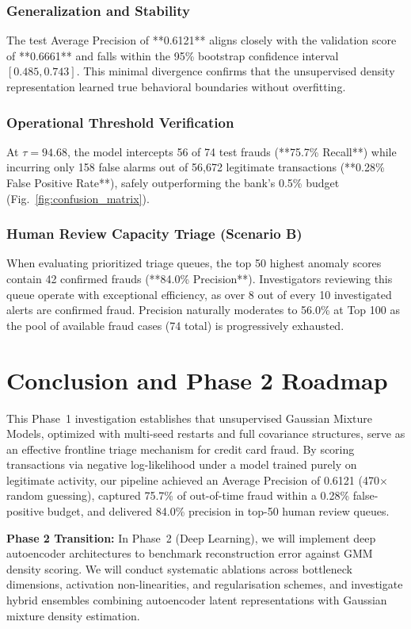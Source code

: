 \documentclass[10pt,journal,compsoc]{IEEEtran}
\begin{document}
\subsubsection{Generalization and Stability}
The test Average Precision of **0.6121** aligns closely with the validation score of **0.6661** and falls within the 95\% bootstrap confidence interval $[0.485, 0.743]$. This minimal divergence confirms that the unsupervised density representation learned true behavioral boundaries without overfitting.

\subsubsection{Operational Threshold Verification}
At $\tau = 94.68$, the model intercepts 56 of 74 test frauds (**75.7\% Recall**) while incurring only 158 false alarms out of 56,672 legitimate transactions (**0.28\% False Positive Rate**), safely outperforming the bank's 0.5\% budget (Fig.~\ref{fig:confusion_matrix}).

\subsubsection{Human Review Capacity Triage (Scenario B)}
When evaluating prioritized triage queues, the top 50 highest anomaly scores contain 42 confirmed frauds (**84.0\% Precision**). Investigators reviewing this queue operate with exceptional efficiency, as over 8 out of every 10 investigated alerts are confirmed fraud. Precision naturally moderates to 56.0\% at Top 100 as the pool of available fraud cases (74 total) is progressively exhausted.

\section{Conclusion and Phase 2 Roadmap}
This Phase~1 investigation establishes that unsupervised Gaussian Mixture Models, optimized with multi-seed restarts and full covariance structures, serve as an effective frontline triage mechanism for credit card fraud. By scoring transactions via negative log-likelihood under a model trained purely on legitimate activity, our pipeline achieved an Average Precision of 0.6121 (470$\times$ random guessing), captured 75.7\% of out-of-time fraud within a 0.28\% false-positive budget, and delivered 84.0\% precision in top-50 human review queues.

\textbf{Phase 2 Transition:} In Phase~2 (Deep Learning), we will implement deep autoencoder architectures to benchmark reconstruction error against GMM density scoring. We will conduct systematic ablations across bottleneck dimensions, activation non-linearities, and regularisation schemes, and investigate hybrid ensembles combining autoencoder latent representations with Gaussian mixture density estimation.
\end{document}
